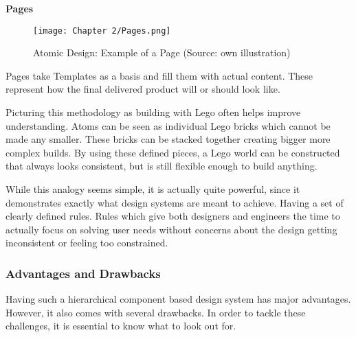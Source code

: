 \textbf{Pages}\\
\begin{figure}[H]
	\centering
    \texttt{[image: Chapter 2/Pages.png]}
    \caption{Atomic Design: Example of a Page (Source: own illustration)}
\end{figure}
Pages take Templates as a basis and fill them with actual content. These represent how the final
delivered product will or should look like. 

Picturing this methodology as building with Lego often helps improve understanding. Atoms can be
seen as individual Lego bricks which cannot be made any smaller. These bricks can be stacked
together creating bigger more complex builds. By using these defined pieces, a Lego world can be
constructed that always looks consistent, but is still flexible enough to build anything.

While this analogy seems simple, it is actually quite powerful, since it demonstrates exactly what
design systems are meant to achieve. Having a set of clearly defined rules. Rules which give both
designers and engineers the time to actually focus on solving user needs without concerns about the
design getting inconsistent or feeling too constrained.

\subsubsection{Advantages and Drawbacks}
Having such a hierarchical component based design system has major advantages. However, it also
comes with several drawbacks. In order to tackle these challenges, it is essential to know what to
look out for.

